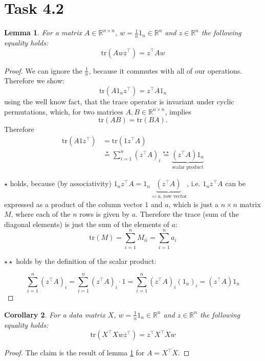 \documentclass[10pt,a4paper]{article}
\newtheorem{lemma}{Lemma}
\newtheorem{corollary}[lemma]{Corollary}
\newcommand {\R} {\mathbb{R}}
\newcommand{\tr}{\text{tr}}
\newcommand{\1}{\mymathbb{1}}
\begin{document}
\section*{Task 4.2}

\begin{lemma} \label{l1}
    For a matrix $A\in\R^{n\times n}$, $w=\frac{1}{n}1_n\in \R^n$ and $z\in\R^n$ the following equality holds:
    \[\tr(Awz^\intercal)=z^\intercal A w\]
\end{lemma}

\begin{proof}
    We can ignore the $\frac{1}{n}$, because it commutes with all of our operations. Therefore we show:
    \[\tr(A1_nz^\intercal)=z^\intercal A 1_n\]
    using the well know fact, that the trace operator is invariant under cyclic permutations, which, for two matrices $A,B\in\R^{n\times n}$, implies 
    \[\tr(AB)=\tr(BA).\]
    Therefore
    \begin{align*}
        \tr(A1z^\intercal)&=\tr(1z^\intercal A)\\
        &\stackrel{\star}{=}\sum_{i=1}^n(z^\intercal A)_i
        \stackrel{\star\star}{=}\underbrace{(z^\intercal A)1_n}_{\text{scalar product}}
    \end{align*}

    $\star$ holds, because (by associativity) $1_nz^\intercal A=1_n\underbrace{(z^\intercal A)}_{\eqqcolon a\text{, row vector}}$, i.e. 
    $1_nz^\intercal A$ can be expressed as a product of the column vector $1$ and $a$, which is just a $n\times n$ matrix $M$,
    where each of the $n$ rows is given by $a$. Therefore the trace (sum of the diagonal elements) is just the sum of the elements of $a$:
    \[\tr(M)=\sum_{i=1}^n M_{ii}=\sum_{i=1}^n a_i\]

    $\star\star$ holds by the definition of the scalar product:

    \[\sum_{i=1}^n(z^\intercal A)_i=\sum_{i=1}^n(z^\intercal A)_i\cdot 1 =\sum_{i=1}^n(z^\intercal A)_i(1_n)_i=(z^\intercal A)1_n \]

\end{proof}

\begin{corollary}
    For a data matrix $X$, $w=\frac{1}{n}1_n\in \R^n$ and $z\in\R^n$ the following equality holds:
    \[\tr(X^\intercal Xwz^\intercal)=z^\intercal X^\intercal X w\]
\end{corollary}

\begin{proof}
    The claim is the result of lemma \ref{l1} for $A=X^\intercal X$.
\end{proof}
\end{document}

